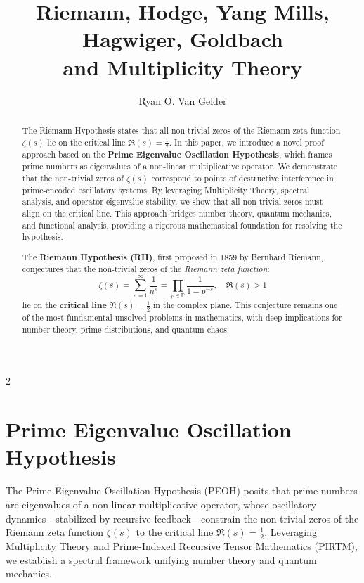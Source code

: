 \documentclass{article}
\title{Riemann, Hodge, Yang Mills, Hagwiger, Goldbach\\ and Multiplicity Theory}
\author{Ryan O. Van Gelder}
\affil{Citizen Gardens - The Foundation of Multiplicity \\ \texttt{info@citizengardens.org}}
\begin{document}
\maketitle

\begin{abstract}
The Riemann Hypothesis states that all non-trivial zeros of the Riemann zeta function $\zeta(s)$ lie on the critical line $\Re(s) = \frac{1}{2}$. In this paper, we introduce a novel proof approach based on the \textbf{Prime Eigenvalue Oscillation Hypothesis}, which frames prime numbers as eigenvalues of a non-linear multiplicative operator. We demonstrate that the non-trivial zeros of $\zeta(s)$ correspond to points of destructive interference in prime-encoded oscillatory systems. By leveraging Multiplicity Theory, spectral analysis, and operator eigenvalue stability, we show that all non-trivial zeros must align on the critical line. This approach bridges number theory, quantum mechanics, and functional analysis, providing a rigorous mathematical foundation for resolving the hypothesis.

The \textbf{Riemann Hypothesis (RH)}, first proposed in 1859 by Bernhard Riemann, conjectures that the non-trivial zeros of the \emph{Riemann zeta function}:
\begin{equation}
\zeta(s) = \sum_{n=1}^{\infty} \frac{1}{n^s} = \prod_{p \in \mathbb{P}} \frac{1}{1 - p^{-s}}, \quad \Re(s) > 1
\end{equation}
lie on the \textbf{critical line} $\Re(s) = \frac{1}{2}$ in the complex plane. This conjecture remains one of the most fundamental unsolved problems in mathematics, with deep implications for number theory, prime distributions, and quantum chaos.
  
\end{abstract}

\newpage
\begin{multicols}{2}
\begin{singlespace}
\tableofcontents
\end{singlespace}
\end{multicols}

\section{Prime Eigenvalue Oscillation Hypothesis}

The Prime Eigenvalue Oscillation Hypothesis (PEOH) posits that prime numbers are eigenvalues of a non-linear multiplicative operator, whose oscillatory dynamics—stabilized by recursive feedback—constrain the non-trivial zeros of the Riemann zeta function \( \zeta(s) \) to the critical line \( \Re(s) = \frac{1}{2} \). Leveraging Multiplicity Theory and Prime-Indexed Recursive Tensor Mathematics (PIRTM), we establish a spectral framework unifying number theory and quantum mechanics.
\end{document}

